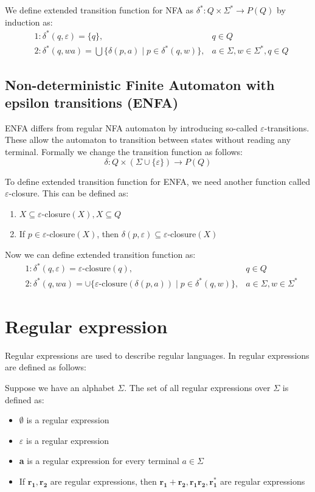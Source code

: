 \documentclass{ctuthesis}
\begin{document}
We define extended transition function for NFA as $\delta^* : Q \times \Sigma^* \rightarrow P(Q)$ by induction as:
\begin{align*}
	&1: \delta^*(q, \varepsilon) = \{q\}, &q \in Q \\
	&2: \delta^*(q, wa) = \bigcup\{\delta(p, a) \mid p \in \delta^*(q, w)\}, &a \in \Sigma, w \in \Sigma^*, q \in Q
\end{align*}

\subsection{Non-deterministic Finite Automaton with epsilon transitions (ENFA)}
ENFA differs from regular NFA automaton by introducing so-called $\varepsilon$-transitions. These allow the automaton to transition between states without reading any terminal. Formally we change the transition function as follows:
\begin{equation*}
	\delta: Q \times (\Sigma \cup \{\varepsilon\}) \rightarrow P(Q)
\end{equation*}

To define extended transition function for ENFA, we need another function called $\varepsilon$-closure. This can be defined as:
\begin{enumerate}
	\item $X \subseteq \varepsilon$-closure$(X), X \subseteq Q$
	\item If $p \in \varepsilon$-closure$(X)$, then $\delta(p, \varepsilon) \subseteq \varepsilon$-closure$(X)$
\end{enumerate}

Now we can define extended transition function as:
\begin{align*}
	&1: \delta^*(q, \varepsilon) = \varepsilon\text{-closure}(q), &q \in Q \\
	&2: \delta^*(q, wa) = \cup\{\varepsilon\text{-closure}(\delta(p, a)) \mid p \in \delta^*(q, w)\}, &a \in \Sigma, w \in \Sigma^*
\end{align*}

\section{Regular expression}
\label{sec:regex-def}
Regular expressions are used to describe regular languages. In \cite{demlova} regular expressions are defined as follows:

Suppose we have an alphabet $\Sigma$. The set of all regular expressions over $\Sigma$ is defined as:
\begin{itemize}
	\item $\emptyset$ is a regular expression
	\item $\varepsilon$ is a regular expression
	\item \textbf{a} is a regular expression for every terminal $a \in \Sigma$
	\item If $\mathbf{r_1}, \mathbf{r_2}$ are regular expressions, then $\mathbf{r_1+r_2}, \mathbf{r_1r_2}, \mathbf{r_1^*}$ are regular expressions
\end{itemize}
\end{document}
